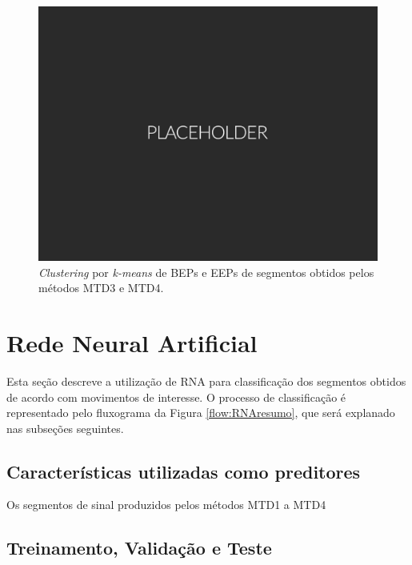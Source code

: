 \begin{figure}[htb]
	\caption{\label{fig:kmeans2}\emph{Clustering} por \emph{k-means} de BEPs e EEPs de segmentos obtidos pelos métodos MTD3 e MTD4.}
	\begin{center}
	    \includegraphics[width=0.75\linewidth]{./img/placeholder.png}
	\end{center}
\end{figure}

\section{Rede Neural Artificial}

Esta seção descreve a utilização de RNA para classificação dos segmentos obtidos de acordo com movimentos de interesse. O processo de classificação é representado pelo fluxograma da Figura \ref{flow:RNAresumo}, que será explanado nas subseções seguintes.



\subsection{Características utilizadas como preditores}

Os segmentos de sinal produzidos pelos métodos MTD1 a MTD4

\subsection{Treinamento, Validação e Teste}
